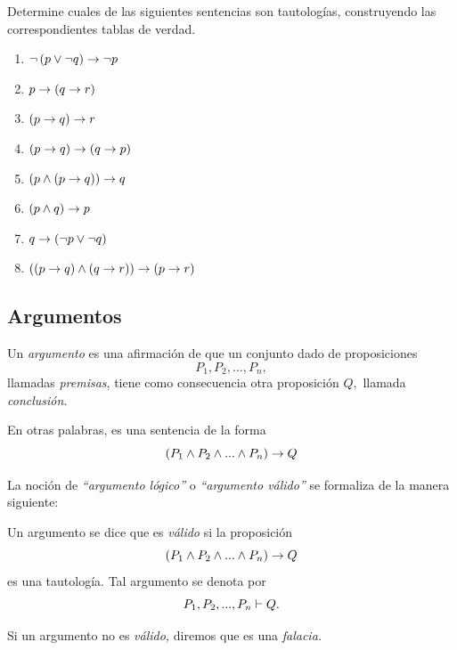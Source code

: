  \begin{resuelto} Determine cuales de las siguientes sentencias son tautologías, construyendo las correspondientes tablas de verdad.
  \begin{enumerate}
   \item $\neg\left( p \vee \neg q \right) \rightarrow \neg p$
   \item $p \rightarrow \left( q\rightarrow r \right)$
   \item $\left( p \rightarrow q \right)\rightarrow r$
   \item $\left( p\rightarrow q \right) \rightarrow \left( q\rightarrow p \right)$
   \item $\left( p \wedge \left( p \rightarrow q \right) \right) \rightarrow q$
   \item $\left( p \wedge q \right) \rightarrow p$
   \item $q \rightarrow \left( \neg p \vee \neg q \right)$
   \item $\left( \left( p\rightarrow q \right) \wedge \left( q \rightarrow r \right) \right) \rightarrow \left( p \rightarrow r \right)$
  \end{enumerate}

 \end{resuelto}



\subsection{Argumentos}


 Un \emph{argumento} es una afirmación de que un conjunto dado de proposiciones $$P_{1}, P_{2},...,P_{n},$$ llamadas \emph{premisas}, tiene como consecuencia otra proposición $Q,$ llamada \emph{conclusión.}

 En otras palabras, es una sentencia de la forma
 $$
  \left( P_{1} \wedge P_{2} \wedge...\wedge P_{n}\right) \rightarrow Q
  $$

 La noción de \emph{``argumento lógico''} o \emph{``argumento válido''} se formaliza de la manera siguiente:

 \begin{definicion}
  \label{lip:4.4}
  Un argumento se dice que es \emph{válido} si la proposición
  $$
  \left( P_{1} \wedge P_{2} \wedge...\wedge P_{n}\right) \rightarrow Q
  $$ es una tautología.
  Tal argumento se denota por $$P_{1}, P_{2},...,P_{n} \vdash Q.$$

   Si un argumento no es \emph{válido,} diremos que es una \emph{falacia.}
 \end{definicion}




